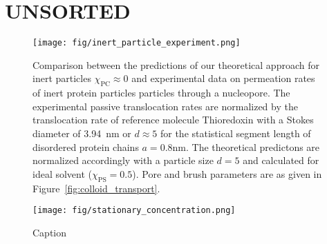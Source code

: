 \documentclass[12pt, a4paper]{article}
\begin{document}
\section{UNSORTED}
\begin{figure}
    \centering
    \texttt{[image: fig/inert\_particle\_experiment.png]}
    \caption{
    Comparison between the predictions of our theoretical approach for inert particles $\chi_{\text{PC}} \approx 0$ and experimental data \cite{Mohr2009} on permeation rates of inert protein particles particles through a nucleopore.
    The experimental passive translocation rates are normalized by the translocation rate of reference molecule Thioredoxin with a Stokes diameter of 3.94~nm or $d\approx 5$ for the statistical segment length of disordered protein chains $a=0.8 \text{nm}$.
    The theoretical predictons are normalized accordingly with a particle size $d=5$ and calculated for ideal solvent ($\chi_{\text{PS}}=0.5$).
    Pore and brush parameters are as given in Figure~\ref{fig:colloid_transport}. 
    }
    \label{fig:inert_colloid}
\end{figure}

\begin{figure}
    \centering
    \texttt{[image: fig/stationary\_concentration.png]}
    \caption{
    Caption    
    }
    \label{fig:stationary_concentration}
\end{figure}

\pagebreak

\printbibliography
\end{document}
